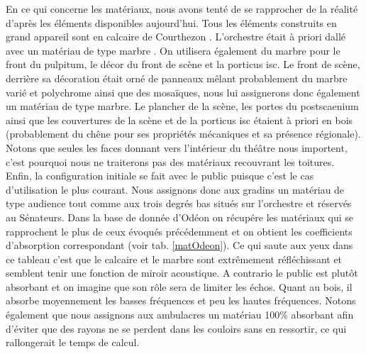 En ce qui concerne les matériaux, nous avons tenté de se rapprocher de la réalité d'après les éléments disponibles aujourd'hui. Tous les éléments construits en grand appareil sont en calcaire de Courthezon \cite[p.43]{orangeTxt}. L'orchestre était à priori dallé avec un matériau de type marbre \cite[p.337]{orangeTxt}. On utilisera également du marbre pour le front du \gls{pulpitum}, le décor du front de scène et la \gls{porticus isc}. Le front de scène, derrière sa décoration était orné de panneaux mêlant probablement du marbre varié et polychrome ainsi que des mosaïques, nous lui assignerons donc également un matériau de type marbre. Le plancher de la scène, les portes du \gls{postscaenium} ainsi que les couvertures de la scène et de la \gls{porticus isc} étaient à priori en bois (probablement du chêne pour ses propriétés mécaniques et sa présence régionale). Notons que seules les faces donnant vers l'intérieur du théâtre nous importent, c'est pourquoi nous ne traiterons pas des matériaux recouvrant les toitures. Enfin, la configuration initiale se fait avec le public puisque c'est le cas d'utilisation le plus courant. Nous assignons donc aux gradins un matériau de type audience tout comme aux trois degrés bas situés sur l'orchestre et réservés au Sénateurs. Dans la base de donnée d'Odéon \cite[materials]{odeon} on récupére les matériaux qui se rapprochent le plus de ceux évoqués précédemment et on obtient les coefficients d'absorption correspondant (voir tab. \ref{matOdeon}). Ce qui saute aux yeux dans ce tableau c'est que le calcaire et le marbre sont extrêmement réfléchissant et semblent tenir une fonction de miroir acoustique. A contrario le public est plutôt absorbant et on imagine que son rôle sera de limiter les échos. Quant au bois, il absorbe moyennement les basses fréquences et peu les hautes fréquences. Notons également que nous assignons aux ambulacres un matériau 100\% absorbant afin d'éviter que des rayons ne se perdent dans les couloirs sans en ressortir, ce qui rallongerait le temps de calcul.
%
